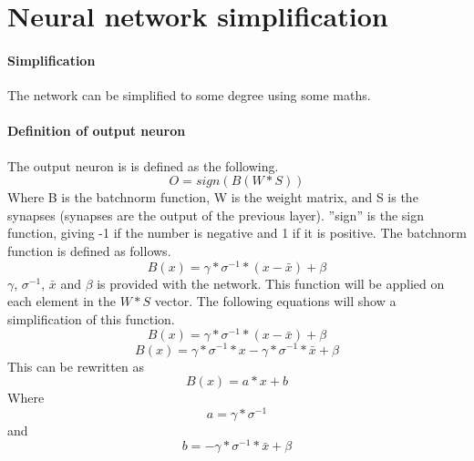 \documentclass[a4paper, twoside, titlepage, 11pt]{article}
\begin{document}
	
	\pagestyle{headings}
	
	
	\section{Neural network simplification}
	\paragraph{Simplification}
	The network can be simplified to some degree using some maths.
	
	\paragraph{Definition of output neuron}
	The output neuron is is defined as the following.
	\begin{equation}
	O = sign(B(W * S))
	\end{equation}
	Where B is the batchnorm function, W is the weight matrix, and S is the synapses (synapses are the output of the previous layer). ''sign'' is the sign function, giving -1 if the number is negative and 1 if it is positive. The batchnorm function is defined as follows.
	\begin{equation}
		B(x) = \gamma * \sigma^{-1} * (x - \bar{x}) + \beta
	\end{equation}
	\(\gamma\), \(\sigma^{-1}\), \(\bar{x}\) and \(\beta\) is provided with the network. This function will be applied on each element in the \(W * S\) vector. The following equations will show a simplification of this function.
	\begin{equation}
		B(x) = \gamma * \sigma^{-1} * (x - \bar{x}) + \beta
	\end{equation}
	\begin{equation}
		B(x) = \gamma * \sigma^{-1} * x - \gamma * \sigma^{-1} * \bar{x} + \beta
	\end{equation}
	This can be rewritten as
	\begin{equation}
		B(x) = a * x + b
	\end{equation}
	Where
	\begin{equation}
		a = \gamma * \sigma^{-1}
	\end{equation}
	and
	\begin{equation}
		b = -\gamma * \sigma^{-1} * \bar{x} + \beta
	\end{equation}
\end{document}
